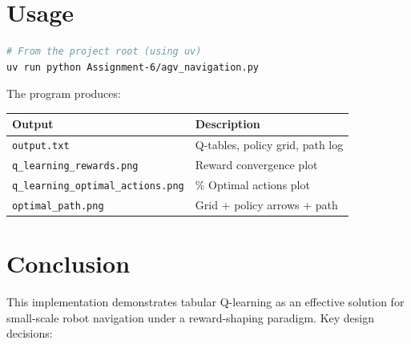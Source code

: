 \documentclass[12pt]{article}
\begin{document}
\section{Usage}

\begin{lstlisting}[language=bash, caption={Running the Q-learning agent.}]
# From the project root (using uv)
uv run python Assignment-6/agv_navigation.py
\end{lstlisting}

The program produces:

\begin{center}
\begin{tabular}{@{} l l @{}}
\toprule
\textbf{Output} & \textbf{Description} \\
\midrule
\texttt{output.txt}                    & Q-tables, policy grid, path log \\
\texttt{q\_learning\_rewards.png}        & Reward convergence plot \\
\texttt{q\_learning\_optimal\_actions.png} & \% Optimal actions plot \\
\texttt{optimal\_path.png}               & Grid + policy arrows + path \\
\bottomrule
\end{tabular}
\end{center}

\section{Conclusion}

This implementation demonstrates tabular Q-learning as an effective solution
for small-scale robot navigation under a reward-shaping paradigm. Key design
decisions:
\end{document}
